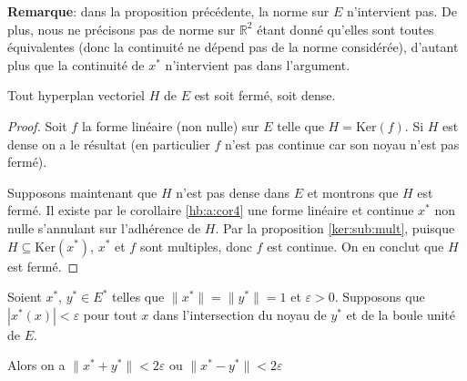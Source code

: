 \textbf{Remarque}: dans la proposition précédente, la norme sur $E$
n'intervient pas. De plus, nous ne précisons pas de norme sur $\mathbb{R}^2$
étant donné qu'elles sont toutes équivalentes (donc la continuité ne
dépend pas de la norme considérée), d'autant plus que la continuité de $x^*$
n'intervient pas dans l'argument.

\begin{prop}
  Tout hyperplan vectoriel $H$ de $E$ est soit fermé, soit dense.
\end{prop}
\begin{proof}
  Soit $f$ la forme linéaire (non nulle)
  sur $E$ telle que $H = \mathrm{Ker}(f)$.
  Si $H$ est dense on a le résultat (en particulier $f$ n'est pas continue
  car son noyau n'est pas fermé).

  Supposons maintenant que $H$ n'est pas dense dans $E$ et
  montrons que $H$ est fermé.
  Il existe par   le corollaire \ref{hb:a:cor4} une forme linéaire
  et continue $x^*$ non nulle s'annulant sur l'adhérence de $H$.
  Par la proposition \ref{ker:sub:mult}, puisque
  $H\subseteq \mathrm{Ker}(x^*)$, $x^*$ et $f$ sont multiples, donc
  $f$ est continue. On en conclut que $H$ est fermé.
\end{proof}


\begin{prop}
  Soient $x^*$, $y^*\in E^*$ telles que $\|x^*\| = \|y^*\| = 1$ et
  $\varepsilon >0$. Supposons que $|x^*(x)| < \varepsilon$ pour tout
  $x$ dans l'intersection du noyau de $y^*$ et de la boule unité de $E$.

  Alors on a $\| x^* + y^*\| < 2\varepsilon$ ou
  $\| x^* - y^*\| < 2\varepsilon$
\end{prop}

